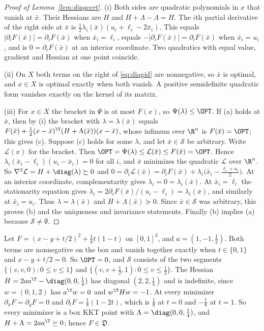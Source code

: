 \begin{proof}[Proof of Lemma~\ref{lem:diagcert}]
(i) Both sides are quadratic polynomials in $x$ that vanish at $\bar x$.
Their Hessians are $H$ and $H+\Lambda-\Lambda=H$. The $i$th partial
derivative of the right side at $\bar x$ is
$\frac12\lambda_i(\bar x)(u_i+\ell_i-2\bar x_i)$. This equals
$|\partial_iF(\bar x)|=\partial_iF(\bar x)$ when $\bar x_i=\ell_i$, equals
$-|\partial_iF(\bar x)|=\partial_iF(\bar x)$ when $\bar x_i=u_i$, and is
$0=\partial_iF(\bar x)$ at an interior coordinate. Two quadratics with equal
value, gradient and Hessian at one point coincide.

(ii) On $X$ both terms on the right of \eqref{eq:diagid} are nonnegative,
so $\bar x$ is optimal, and $x\in X$ is optimal exactly when both vanish. A
positive semidefinite quadratic form vanishes exactly on the kernel of its
matrix.

(iii) For $x\in X$ the bracket in $\Psi$ is at most $F(x)$, so
$\Psi(\lambda)\le\OPT$. If (a) holds at $\bar x$, then by (i) the bracket
with $\lambda=\lambda(\bar x)$ equals
$F(\bar x)+\frac12(x-\bar x)^{\T}(H+\Lambda(\bar x))(x-\bar x)$, whose
infimum over $\R^n$ is $F(\bar x)=\OPT$; this gives (c). Suppose (c) holds
for some $\lambda$, and let $\bar x\in\mathcal S$ be arbitrary. Write
$\mathcal L(x)$ for the bracket. Then
$\OPT=\Psi(\lambda)\le\mathcal L(\bar x)\le F(\bar x)=\OPT$. Hence
$\lambda_i(\bar x_i-\ell_i)(u_i-\bar x_i)=0$ for all $i$, and $\bar x$
minimizes the quadratic $\mathcal L$ over $\R^n$. So
$\nabla^2\mathcal L=H+\diag(\lambda)\succeq0$ and
$0=\partial_i\mathcal L(\bar x)=\partial_iF(\bar x)+\lambda_i\bigl(\bar x_i-\tfrac{\ell_i+u_i}2\bigr)$.
At an interior coordinate, complementarity gives
$\lambda_i=0=\lambda_i(\bar x)$. At $\bar x_i=\ell_i$ the stationarity
equation gives $\lambda_i=2\partial_iF(\bar x)/(u_i-\ell_i)=\lambda_i(\bar x)$,
and similarly at $\bar x_i=u_i$. Thus $\lambda=\lambda(\bar x)$ and
$H+\Lambda(\bar x)\succeq0$. Since $\bar x\in\mathcal S$ was arbitrary, this
proves (b) and the uniqueness and invariance statements. Finally (b) implies
(a) because $\mathcal S\ne\emptyset$.
\end{proof}

\begin{example}\label{ex:diagtilt}
Let $F=(x-y+t/2)^2+\frac18t(1-t)$ on $[0,1]^3$, and $a=(1,-1,\frac12)$. Both
terms are nonnegative on the box and vanish together exactly when
$t\in\{0,1\}$ and $x-y+t/2=0$. So $\OPT=0$, and $\mathcal S$ consists of the
two segments $\{(v,v,0):0\le v\le1\}$ and $\{(v,v+\frac12,1):0\le
v\le\frac12\}$. The Hessian $H=2aa^{\T}-\diag(0,0,\frac14)$ has diagonal
$(2,2,\frac14)$ and is indefinite, since $w=(0,1,2)$ has $a^{\T}w=0$ and
$w^{\T}Hw=-1$. At every minimizer $\partial_xF=\partial_yF=0$ and
$\partial_tF=\frac18(1-2t)$, which is $\frac18$ at $t=0$ and $-\frac18$ at
$t=1$. So every minimizer is a box KKT point with
$\Lambda=\diag(0,0,\frac14)$, and $H+\Lambda=2aa^{\T}\succeq0$; hence
$F\in\mathfrak D$.
\end{example}

